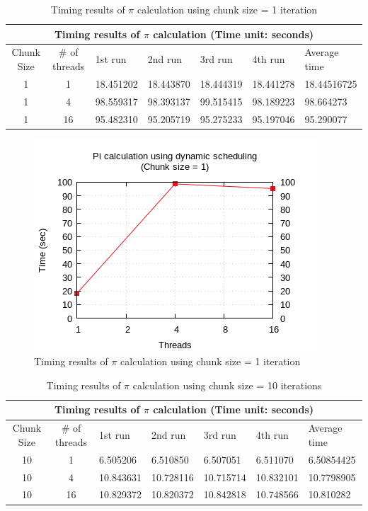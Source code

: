 \documentclass{article}
\begin{document}
\begin{table}[htbp]
  \centering
    \begin{tabular}{|c c||l l l l| l|} 
    \hline
    \multicolumn{7}{|c|}{Timing results of $\pi$ calculation (Time unit: seconds)} \\
    \hline
    Chunk Size & \# of threads & 1st run & 2nd run & 3rd run & 4th run & Average time\\ [0.5ex] 
    \hline\hline
    1 & 1 & 18.451202 & 18.443870 & 18.444319 & 18.441278 & 18.44516725 \\ 
    \hline
    1 & 4 & 98.559317 & 98.393137 & 99.515415 & 98.189223 & 98.664273 \\
    \hline
    1 & 16 & 95.482310 & 95.205719 & 95.275233 & 95.197046 & 95.290077 \\ [1ex]
    \hline
    \end{tabular}
  \caption{Timing results of $\pi$ calculation using chunk size = 1 iteration}
\end{table}


\begin{figure}[htbp]
  \centering
  \includegraphics[width=0.55\columnwidth]{../../hw1/ex1/plots/pi_c1.png}
  \caption{Timing results of $\pi$ calculation using chunk size = 1 iteration}
\end{figure}


\begin{table}[htbp]
  \centering
    \begin{tabular}{|c c||l l l l| l|} 
    \hline
    \multicolumn{7}{|c|}{Timing results of $\pi$ calculation (Time unit: seconds)} \\
    \hline
    Chunk Size & \# of threads & 1st run & 2nd run & 3rd run & 4th run & Average time\\ [0.5ex] 
    \hline\hline
    10 & 1 & 6.505206 & 6.510850 & 6.507051 & 6.511070 & 6.50854425 \\
    \hline
    10 & 4 & 10.843631 & 10.728116 & 10.715714 & 10.832101 & 10.7798905 \\
    \hline
    10 & 16 & 10.829372 & 10.820372 & 10.842818 & 10.748566 & 10.810282 \\ [1ex]
    \hline
    \end{tabular}
  \caption{Timing results of $\pi$ calculation using chunk size = 10 iterations}
\end{table}
\end{document}

